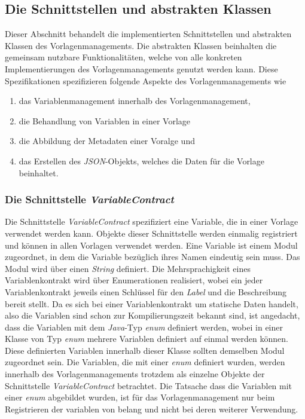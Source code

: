 \subsection{Die Schnittstellen und abstrakten Klassen}
Dieser Abschnitt behandelt die implementierten Schnittstellen und abstrakten Klassen des Vorlagenmanagements. Die abstrakten Klassen beinhalten die gemeinsam nutzbare Funktionalitäten, welche von alle konkreten Implementierungen des Vorlagenmanagements genutzt werden kann. Diese Spezifikationen spezifizieren folgende Aspekte des Vorlagenmanagements wie
\begin{enumerate}
	\item das Variablenmanagement innerhalb des Vorlagenmanagement,
	\item die Behandlung von Variablen in einer Vorlage 
	\item die Abbildung der Metadaten einer Voralge und 
	\item das Erstellen des \emph{JSON}-Objekts, welches die Daten für die Vorlage beinhaltet.
\end{enumerate}

\subsubsection{Die Schnittstelle \emph{VariableContract}}
\label{sec:variableContract}
Die Schnittstelle \emph{VariableContract} spezifiziert eine Variable, die in einer Vorlage verwendet werden kann. Objekte dieser Schnittstelle werden einmalig registriert und können in allen Vorlagen verwendet werden. Eine Variable ist einem Modul zugeordnet, in dem die Variable bezüglich ihres Namen eindeutig sein muss. Das Modul wird über einen \emph{String} definiert. Die Mehrsprachigkeit eines Variablenkontrakt wird über Enumerationen realisiert, wobei ein jeder Variablenkontrakt jeweils einen Schlüssel für den \emph{Label} und die Beschreibung bereit stellt. 
\newline
\newline
Da es sich bei einer Variablenkontrakt um statische Daten handelt, also die Variablen sind schon zur Kompilierungszeit bekannt sind, ist angedacht, dass die Variablen mit dem \emph{Java}-Typ \emph{enum} definiert werden, wobei in einer Klasse von Typ \emph{enum} mehrere Variablen definiert auf einmal werden können. Diese definierten Variablen innerhalb dieser Klasse sollten demselben Modul zugeordnet sein. Die Variablen, die mit einer \emph{enum} definiert wurden, werden innerhalb des Vorlagenmanagements trotzdem als einzelne Objekte der Schnittstelle \emph{VariableContract} betrachtet. Die Tatsache dass die Variablen mit einer \emph{enum} abgebildet wurden, ist für das Vorlagenmanagement nur beim Registrieren der variablen von belang und nicht bei deren weiterer Verwendung.
\newpage

